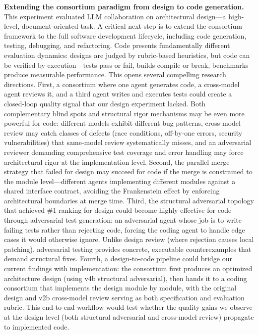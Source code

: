 \documentclass[conference]{IEEEtran}
\begin{document}
\textbf{Extending the consortium paradigm from design to code generation.} This experiment evaluated LLM collaboration on architectural design---a high-level, document-oriented task. A critical next step is to extend the consortium framework to the full software development lifecycle, including code generation, testing, debugging, and refactoring. Code presents fundamentally different evaluation dynamics: designs are judged by rubric-based heuristics, but code can be verified by execution---tests pass or fail, builds compile or break, benchmarks produce measurable performance. This opens several compelling research directions. First, a consortium where one agent generates code, a cross-model agent reviews it, and a third agent writes and executes tests could create a closed-loop quality signal that our design experiment lacked. Both complementary blind spots and structural rigor mechanisms may be even more powerful for code: different models exhibit different bug patterns, cross-model review may catch classes of defects (race conditions, off-by-one errors, security vulnerabilities) that same-model review systematically misses, and an adversarial reviewer demanding comprehensive test coverage and error handling may force architectural rigor at the implementation level. Second, the parallel merge strategy that failed for design may succeed for code if the merge is constrained to the module level---different agents implementing different modules against a shared interface contract, avoiding the Frankenstein effect by enforcing architectural boundaries at merge time. Third, the structural adversarial topology that achieved \#1 ranking for design could become highly effective for code through adversarial test generation: an adversarial agent whose job is to write failing tests rather than rejecting code, forcing the coding agent to handle edge cases it would otherwise ignore. Unlike design review (where rejection causes local patching), adversarial testing provides concrete, executable counterexamples that demand structural fixes. Fourth, a design-to-code pipeline could bridge our current findings with implementation: the consortium first produces an optimized architecture design (using v4b structural adversarial), then hands it to a coding consortium that implements the design module by module, with the original design and v2b cross-model review serving as both specification and evaluation rubric. This end-to-end workflow would test whether the quality gains we observe at the design level (both structural adversarial and cross-model review) propagate to implemented code.
\end{document}
